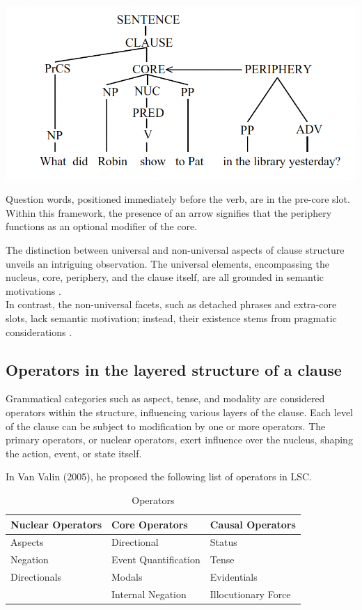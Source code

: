 \includegraphics[width=\textwidth]{figures/completeclausestructure.png}

Question words, positioned immediately before the verb, are in the pre-core slot. Within this framework, the presence of an arrow signifies that the periphery functions as an optional modifier of the core.


The distinction between universal and non-universal aspects of clause structure unveils an intriguing observation. The universal elements, encompassing the nucleus, core, periphery, and the clause itself, are all grounded in semantic motivations \parencite{van1997syntax}.\\

In contrast, the non-universal facets, such as detached phrases and extra-core slots, lack semantic motivation; instead, their existence stems from pragmatic considerations \parencite{van1997syntax}. 


\subsection{Operators in the layered structure of a clause}

Grammatical categories such as aspect, tense, and modality are considered operators within the structure, influencing various layers of the clause. Each level of the clause can be subject to modification by one or more operators. The primary operators, or nuclear operators, exert influence over the nucleus, shaping the action, event, or state itself.

In Van Valin (2005), he proposed the following list of operators in LSC. 


\begin{table}[H]
    \centering
    \begin{tabular}{|p{4cm}|p{4cm}|p{4cm}|} \hline
         \textbf{Nuclear Operators} & \textbf{Core Operators} & \textbf{Causal Operators} \\ \hline 
         Aspects&  Directional & Status\\ \hline 
         Negation & Event Quantification & Tense\\ \hline 
         Directionals & Modals & Evidentials\\ \hline 
         &  Internal Negation & Illocutionary Force\\ \hline
    \end{tabular}
    \caption{Operators}
    \label{tab:operators}
\end{table}



